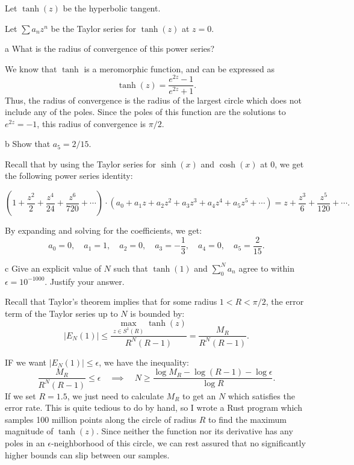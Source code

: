 \documentclass[11pt,letterpaper]{article}
\begin{document}
\begin{problem}
    Let $\tanh(z)$ be the hyperbolic tangent.
\end{problem}

\begin{solution}
    Let $\sum a_n z^n$ be the Taylor series for $\tanh(z)$ at $z=0$.
    \begin{partproblem}{a}
        What is the radius of convergence of this power series?
    \end{partproblem}

    \quad We know that $\tanh$ is a meromorphic function, and can be expressed as 
    \[
        \tanh(z) = \frac{e^{2z}-1}{e^{2z}+1}
    .\]
    Thus, the radius of convergence is the radius of the largest circle which does not include any of the poles. Since the poles of this function are the solutions to $e^{2z}=-1$, this radius of convergence is $\pi /2$.

    \begin{partproblem}{b}
        Show that $a_5 = 2 /15$.
    \end{partproblem}

    \quad Recall that by using the Taylor series for $\sinh(x)$ and $\cosh(x)$ at $0$, we get the following power series identity:

    \[
        \left(1+\frac{z^2}{2}+\frac{z^4}{24}+\frac{z^6}{720}+\cdots\right)\cdot (a_0+a_1z+a_2z^2+a_3z^3+a_4z^4+a_5z^5+\cdots) = z+\frac{z^3}{6}+\frac{z^5}{120}+\cdots
    .\] 

    By expanding and solving for the coefficients, we get:
    \[
        a_0 = 0,\quad a_1 = 1, \quad a_2 = 0, \quad a_3 = - \frac{1}{3},\quad a_4 = 0,\quad a_5 = \frac{2}{15}
    .\] 

    \begin{partproblem}{c}
        Give an explicit value of $N$ such that $\tanh(1)$ and $\sum^N_0 a_n$ agree to within $\epsilon = 10^{-1000}$. Justify your answer.
    \end{partproblem}

    \quad Recall that Taylor's theorem implies that for some radius $1<R<\pi /2$, the error term of the Taylor series up to $N$ is bounded by:
    \[
        |E_N(1)| \leq \frac{\max_{z\in S^1(R)} \tanh(z)}{R^N(R-1)} = \frac{M_R}{R^N(R-1)}
    .\] 

    IF we want $|E_N(1)|\leq \epsilon$, we have the inequality:
    \[
        \frac{M_R}{R^N(R-1)}\leq \epsilon\quad\implies\quad N \geq \frac{\log M_R - \log (R - 1) -\log \epsilon}{\log R}
    .\] 
    If we set $R=1.5$, we just need to calculate $M_R$ to get an $N$ which satisfies the error rate. This is quite tedious to do by hand, so I wrote a Rust program which samples 100 million points along the circle of radius $R$ to find the maximum magnitude of $\tanh(z)$. Since neither the function nor its derivative has any poles in an $\epsilon$-neighborhood of this circle, we can rest assured that no significantly higher bounds can slip between our samples.


\end{solution}
\end{document}
